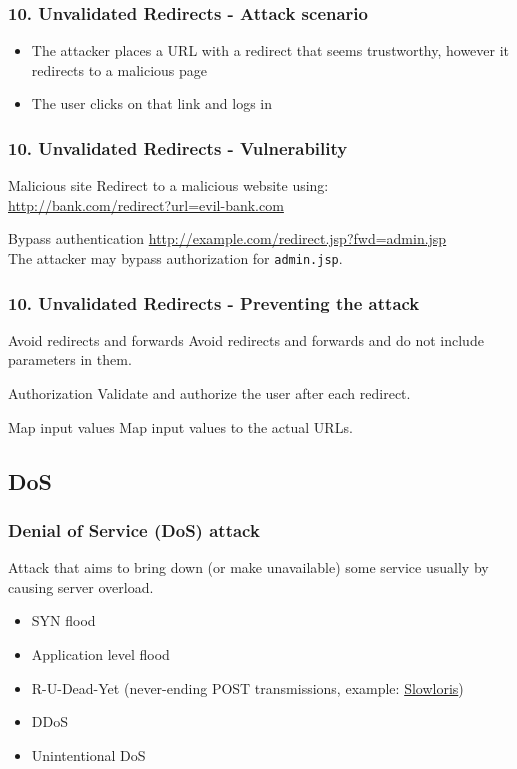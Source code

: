 \begin{frame}
\frametitle{10. Unvalidated Redirects - Attack scenario}
\begin{itemize}
\item The attacker places a URL with a redirect that seems trustworthy,
	however it redirects to a malicious page
\item The user clicks on that link and logs in
\end{itemize}
\end{frame}

\begin{frame}
\frametitle{10. Unvalidated Redirects - Vulnerability}
\begin{exampleblock}{Malicious site}
Redirect to a malicious website using:
\\ \url{http://bank.com/redirect?url=evil-bank.com}
\end{exampleblock}
\begin{exampleblock}{Bypass authentication}
\url{http://example.com/redirect.jsp?fwd=admin.jsp}
\\ The attacker may bypass authorization for \texttt{admin.jsp}.
\end{exampleblock}
\end{frame}

\begin{frame}
\frametitle{10. Unvalidated Redirects - Preventing the attack}
\begin{block}{Avoid redirects and forwards}
Avoid redirects and forwards and do not include parameters in them.
\end{block}
\begin{block}{Authorization}
Validate and authorize the user after each redirect.
\end{block}
\begin{exampleblock}{Map input values}
Map input values to the actual URLs.
\end{exampleblock}
\end{frame}

\subsection{DoS}

\begin{frame}
\frametitle{Denial of Service (DoS) attack}
Attack that aims to bring down (or make unavailable) some service usually by
causing server overload.
\begin{itemize}
\item SYN flood
\item Application level flood
\item R-U-Dead-Yet
	(never-ending POST transmissions,
	example: \href{http://ha.ckers.org/slowloris/}{Slowloris})
\item DDoS
\item Unintentional DoS
\end{itemize}
\end{frame}

